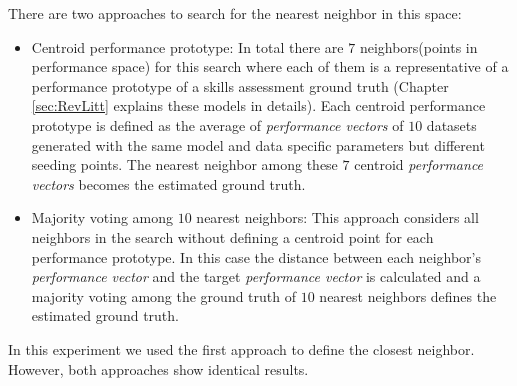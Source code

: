 There are two approaches to search for the nearest neighbor in this space:
\begin{itemize}
\item Centroid performance prototype: In total there are $7$ neighbors(points in performance space) for this search where each of them is a representative of a performance prototype of a skills assessment ground truth (Chapter \ref{sec:RevLitt} explains these models in details). Each centroid performance prototype is defined as the average of \textit{performance vectors} of $10$ datasets generated with the same model and data specific parameters but different seeding points. The nearest neighbor among these $7$ centroid \textit{performance vectors} becomes the estimated ground truth.
\item Majority voting among $10$ nearest neighbors: This approach considers all neighbors in the search without defining a centroid point for each performance prototype. In this case the distance between each neighbor's \textit{performance vector} and the target \textit{performance vector} is calculated and a majority voting among the ground truth of $10$ nearest neighbors defines the estimated ground truth.
\end{itemize}

In this experiment we used the first approach to define the closest neighbor. However, both approaches show identical results.





